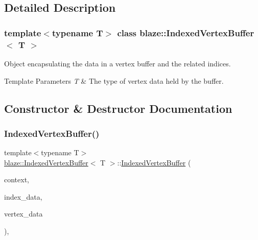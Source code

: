 \subsection{Detailed Description}
\subsubsection*{template$<$typename T$>$\newline
class blaze\+::\+Indexed\+Vertex\+Buffer$<$ T $>$}

Object encapsulating the data in a vertex buffer and the related indices. 


\begin{DoxyTemplParams}{Template Parameters}
{\em T} & The type of vertex data held by the buffer. \\
\hline
\end{DoxyTemplParams}


\subsection{Constructor \& Destructor Documentation}
\mbox{\label{classblaze_1_1IndexedVertexBuffer_a569c5890b3b517a4d08b6bc46e1ec71c}} 
\subsubsection{\texorpdfstring{Indexed\+Vertex\+Buffer()}{IndexedVertexBuffer()}}
{\footnotesize\ttfamily template$<$typename T$>$ \\
\hyperlink{classblaze_1_1IndexedVertexBuffer}{blaze\+::\+Indexed\+Vertex\+Buffer}$<$ T $>$\+::\hyperlink{classblaze_1_1IndexedVertexBuffer}{Indexed\+Vertex\+Buffer} (\begin{DoxyParamCaption}\item[{const \hyperlink{classblaze_1_1Context}{Context} \&}]{context,  }\item[{const std\+::vector$<$ uint32\+\_\+t $>$ \&}]{index\+\_\+data,  }\item[{const std\+::vector$<$ T $>$ \&}]{vertex\+\_\+data }\end{DoxyParamCaption})\hspace{0.3cm}{\ttfamily [inline]}, {\ttfamily [noexcept]}}



